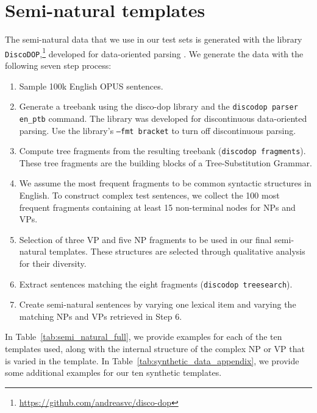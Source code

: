 \onecolumn
\section{Semi-natural templates}
\label{ap:ddop}

The semi-natural data that we use in our test sets is generated with the library \texttt{DiscoDOP},\footnote{\url{https://github.com/andreasvc/disco-dop}} developed for data-oriented parsing \citep{vancranenburgh2016disc}. 
We generate the data with the following seven step process:

\begin{enumerate}[wide, labelwidth=!, labelindent=0pt, itemsep=0pt, parsep=3pt]
\item[\textbf{Step 1.}] Sample 100k English OPUS sentences. 
\item[\textbf{Step 2.}] Generate a treebank using the disco-dop library and the \texttt{discodop parser en\_ptb} command. The library was developed for discontinuous data-oriented parsing. Use the library's \texttt{--fmt bracket} to turn off discontinuous parsing.
\item[\textbf{Step 3.}] Compute tree fragments from the resulting treebank (\texttt{discodop fragments}). These tree fragments are the building blocks of a Tree-Substitution Grammar.
\item[\textbf{Step 4.}] We assume the most frequent fragments to be common syntactic structures in English. To construct complex test sentences, we collect the 100 most frequent fragments containing at least 15 non-terminal nodes for NPs and VPs.
\item[\textbf{Step 5.}] Selection of three VP and five NP fragments to be used in our final semi-natural templates. These structures are selected through qualitative analysis for their diversity.
\item[\textbf{Step 6.}] Extract sentences matching the eight fragments (\texttt{discodop treesearch}).
\item[\textbf{Step 7.}] Create semi-natural sentences by varying one lexical item and varying the matching NPs and VPs retrieved in Step 6.
\end{enumerate}

In Table~\ref{tab:semi_natural_full}, we provide examples for each of the ten templates used, along with the internal structure of the complex NP or VP that is varied in the template.
In Table~\ref{tab:synthetic_data_appendix}, we provide some additional examples for our ten synthetic templates.

